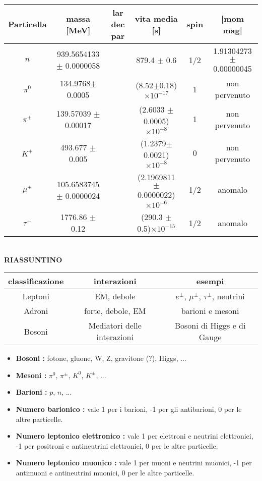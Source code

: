 \documentclass[twoside]{article}
\begin{document}
\begin{tabular}{c|c|c|c|c|c}
    Particella & massa [MeV] & lar dec par & vita media [s] & spin & |mom mag| \\
    \toprule
    $n$ & 939.5654133 $\pm$ 0.0000058  & &879.4 $\pm$ 0.6 & 1/2 & 1.91304273$\pm$0.00000045 \\
    $\pi^0$ & 134.9768$\pm$0.0005 & & (8.52$\pm$0.18)$\times 10^{-17}$& 1 & non pervenuto \\
    $\pi^+$ & 139.57039 $\pm$ 0.00017& &(2.6033 $\pm$0.0005)$\times 10^{-8}$ &  1 & non pervenuto\\
    $K^+$ &  493.677 $\pm$ 0.005 & & (1.2379$\pm$0.0021)$\times 10^{-8}$ & 0 & non pervenuto \\
    $\mu^+$ & 105.6583745$\pm$ 0.0000024  & & (2.1969811 $\pm$ 0.0000022)$\times 10^{-6}$ & 1/2 & anomalo \\ 
    $\tau^+$ & 1776.86 $\pm$ 0.12 & & (290.3 $\pm$ 0.5)$\times10^{-15}$ & 1/2 & anomalo \\ 
    \bottomrule
\end{tabular}
\\
\newline
\newline
\newline
\textbf{RIASSUNTINO}\\
\begin{center}
    \begin{tabular}{|c|c|c|}
    \hline
    classificazione & interazioni & esempi  \\
    \hline
       Leptoni  & EM, debole & $e^{\pm}$, $\mu^{\pm}$, $\tau^{\pm}$, neutrini \\
       \hline
       Adroni & forte, debole, EM & barioni e mesoni \\
       \hline
       Bosoni & Mediatori delle interazioni & Bosoni di Higgs e di Gauge \\
       \hline
    \end{tabular}
\end{center}

\begin{itemize}
    \item \textbf{Bosoni :} fotone, gluone, W, Z, gravitone (?), Higgs, ...
    \item \textbf{Mesoni :} $\pi^0$, $\pi^{\pm}$, $K^0$, $K^{\pm}$, ...
    \item \textbf{Barioni :} $p$, $n$, ...
    \item \textbf{Numero barionico :} vale 1 per i barioni, -1 per gli antibarioni, 0 per le altre particelle.
    \item \textbf{Numero leptonico elettronico :} vale 1 per elettroni e neutrini elettronici, -1 per positroni e antineutrini elettronici, 0 per le altre particelle.
    \item \textbf{Numero leptonico muonico :} vale 1 per muoni e neutrini muonici, -1 per antimuoni e antineutrini muonici, 0 per le altre particelle.
\end{itemize}
\end{document}
